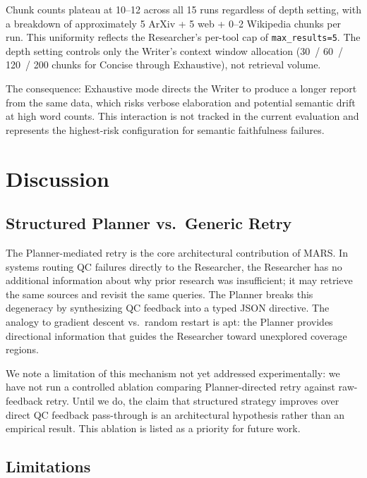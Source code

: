 \documentclass[11pt]{article}
\begin{document}
Chunk counts plateau at 10--12 across all 15 runs regardless of depth setting,
with a breakdown of approximately 5 ArXiv + 5 web + 0--2 Wikipedia chunks per
run. This uniformity reflects the Researcher's per-tool cap of
\texttt{max\_results=5}. The depth setting controls only the Writer's context
window allocation (30~/ 60~/ 120~/ 200 chunks for Concise through Exhaustive),
not retrieval volume.

The consequence: Exhaustive mode directs the Writer to produce a longer report
from the same data, which risks verbose elaboration and potential semantic drift
at high word counts. This interaction is not tracked in the current evaluation
and represents the highest-risk configuration for semantic faithfulness failures.

\section{Discussion}

\subsection{Structured Planner vs.\ Generic Retry}

The Planner-mediated retry is the core architectural contribution of MARS. In
systems routing QC failures directly to the Researcher, the Researcher has no
additional information about why prior research was insufficient; it may retrieve
the same sources and revisit the same queries. The Planner breaks this degeneracy
by synthesizing QC feedback into a typed JSON directive. The analogy to gradient
descent vs.\ random restart is apt: the Planner provides directional information
that guides the Researcher toward unexplored coverage regions.

We note a limitation of this mechanism not yet addressed experimentally: we have
not run a controlled ablation comparing Planner-directed retry against
raw-feedback retry. Until we do, the claim that structured strategy improves over
direct QC feedback pass-through is an architectural hypothesis rather than an
empirical result. This ablation is listed as a priority for future work.

\subsection{Limitations}
\end{document}
